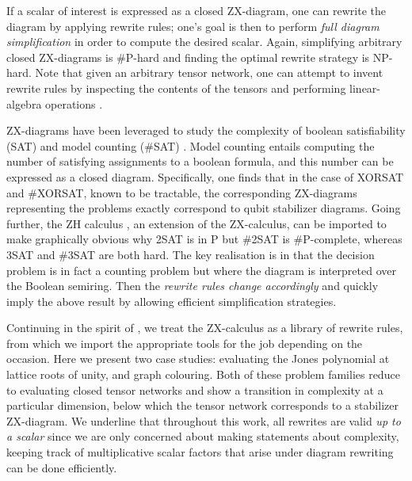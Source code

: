 If a scalar of interest is expressed as a closed ZX-diagram,
one can rewrite the diagram by applying rewrite rules; one's goal is then to perform \emph{full diagram simplification} in order to compute the desired scalar.
Again, simplifying arbitrary closed ZX-diagrams is \#P-hard and finding the optimal rewrite strategy is NP-hard.
Note that
given an arbitrary tensor network, one can attempt to invent rewrite rules by inspecting the contents of the tensors and performing linear-algebra operations \cite{gray2020hyperoptimized}.


ZX-diagrams have been leveraged to study the complexity of boolean satisfiability (SAT) and model counting (\#SAT) \cite{debeaudrap2020tensor}.
Model counting entails computing the number of satisfying assignments to a boolean formula,
and this number can be expressed as a closed diagram.
Specifically, one finds that in the case of XORSAT and \#XORSAT,
known to be tractable,
the corresponding ZX-diagrams representing the problems exactly correspond to qubit stabilizer diagrams.
Going further, the ZH calculus \cite{backens2018zh}, an extension of the ZX-calculus, can be imported to make graphically obvious
why 2SAT is in P but \#2SAT is \#P-complete, whereas 3SAT and \#3SAT are both hard.
The key realisation is in that the decision problem is in fact a counting problem
but where the diagram is interpreted over the Boolean semiring.
Then the \emph{rewrite rules change accordingly} and quickly imply the above result by allowing efficient simplification strategies.

Continuing in the spirit of \cite{debeaudrap2020tensor}, we treat the ZX-calculus as a library of rewrite rules, from which we import the appropriate tools for the job depending on the occasion.
Here we present two case studies: evaluating the Jones polynomial at lattice roots of unity, and graph colouring.
Both of these problem families reduce to evaluating
closed tensor networks and show a transition in complexity
at a particular dimension, below which the tensor network corresponds to a stabilizer ZX-diagram.
We underline that throughout this work, all rewrites are valid
\emph{up to a scalar}
since we are only concerned about making statements about complexity,
keeping track of multiplicative scalar factors that arise under diagram rewriting can be done efficiently.
